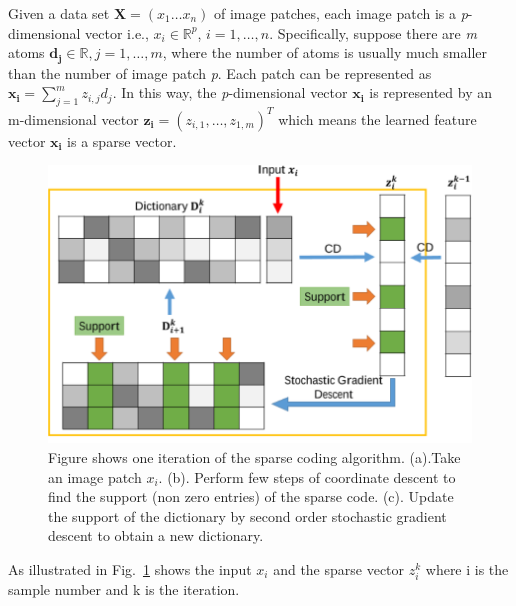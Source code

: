 \documentclass[authoryear,preprint,revi	ew,12pt]{elsarticle}
\begin{document}
Given a data set $\mathbf{X} = (x_1 \dots x_n)$ of image patches, each image patch is a {\em p}-dimensional vector i.e., $ x_i \in \mathbb{R}^{p} $, $ i = 1, \dots, n $. Specifically, suppose there are \emph{m} atoms $ \mathbf{d_j} \in \mathbb{R}, j = 1,\dots,m $, where the number of atoms is usually much smaller than the number of image patch {\em p}. Each patch can be represented as $ \mathbf{x_i} =  \sum^m_{j=1} z_{i,j}d_j $. In this way, the {\em p}-dimensional vector $ \mathbf{x_i} $ is represented by an m-dimensional vector $  \mathbf{z_i} = (z_{i,1},\dots,z_{1,m})^T $ which means the learned feature vector $ \mathbf{x_i} $ is a sparse vector. 

\begin{figure}
	\centering
	\includegraphics[width=\linewidth]{figures/iteration}
	\caption[One Iteration of SCC]{Figure shows one iteration of the sparse coding algorithm. (a).Take an image patch $x_i$. (b). Perform few steps of coordinate descent to find the support (non zero entries) of the sparse code. (c). Update the support of the dictionary by second order stochastic gradient descent to obtain a new dictionary.}
	\label{fig:iteration}
\end{figure}

As illustrated in Fig.~\ref{fig:iteration} shows the input $ x_i $ and the sparse vector $ z^k_i $ where i is the sample number and k is the iteration.
\end{document}
